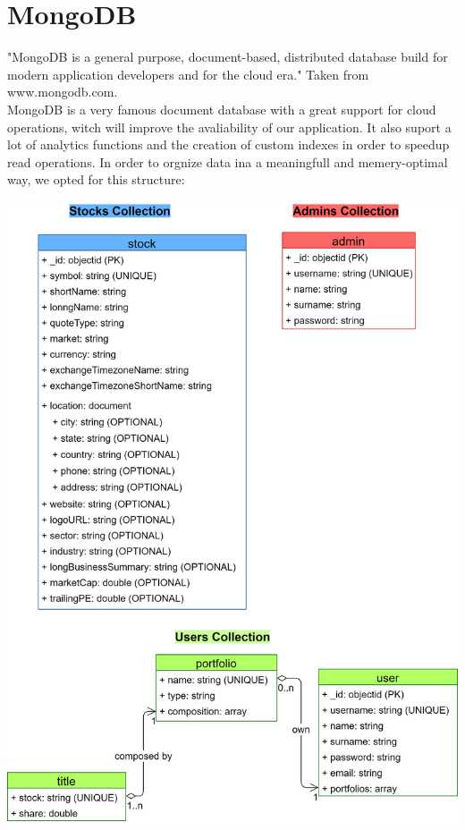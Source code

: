 \section{MongoDB}
"MongoDB is a general purpose, document-based, distributed database build
for modern application developers and for the cloud era." Taken from www.mongodb.com.\\
MongoDB is a very famous document database with a great support for cloud operations, witch 
will improve the avaliability of our application. It also suport a lot of analytics functions
and the creation of custom indexes in order to speedup read operations.
In order to orgnize data ina a meaningfull and memery-optimal way, we opted for this structure:

\includegraphics[scale=0.17]{img/mongoDB_schema.png}\\

